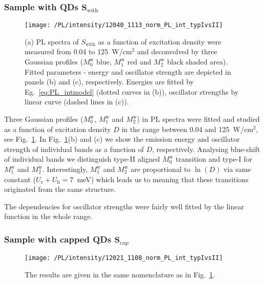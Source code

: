 \subsubsection*{Sample with QDs $\mathbf{S_\mathrm{with}}$}
\begin{figure}
	\centering
	\texttt{[image: /PL/intensity/12040\_1113\_norm\_PL\_int\_typIvsII]}
	\caption{(a) PL spectra of $S_\mathrm{with}$ as a function of excitation density were measured from 0.04 to 125~W/cm$^2$ and deconvolved by three Gaussian profiles ($M_0^\mathrm{w}$ blue, $M_1^\mathrm{w}$ red and $M_2^\mathrm{w}$ black shaded area). Fitted parameters - energy and oscillator strength are depicted in panels (b) and (c), respectively. Energies are fitted by Eg.~\ref{eq:PL_intmodel} (dotted curves in (b)), oscillator strengths by linear curve (dashed lines in (c)).}
	\label{fig:QD_w_int}
\end{figure}

Three Gaussian profiles ($M_0^\mathrm{w}$, $M_1^\mathrm{w}$ and $M_2^\mathrm{w}$) in PL spectra were fitted and studied as a function of excitation density $D$ in the range between 0.04 and 125~W/cm$^2$, see Fig.~\ref{fig:QD_w_int}. In Fig.~\ref{fig:QD_w_int}(b) and (c) we show the emission energy and oscillator strength of individual bands as a function of $D$, respectively. Analysing blue-shift of individual bands we distinguish type-II aligned $M_0^\mathrm{w}$ transition and type-I for $M_1^\mathrm{w}$ and $M_2^\mathrm{w}$. Interestingly, $M_1^\mathrm{w}$ and $M_2^\mathrm{w}$ are proportional to $\ln(D)$ via same constant ($U_\mathrm{e}+U_\mathrm{h}=7$~meV) which leads us to meaning that these transitions originated from the same structure. 

The dependencies for oscillator strengths were fairly well fitted by the linear function in the whole range.




\subsubsection*{Sample with capped QDs $\mathbf{S_\mathrm{cap}}$}
\begin{figure}
	\centering
	\texttt{[image: /PL/intensity/12021\_1108\_norm\_PL\_int\_typIvsII]}
	\caption{The results are given in the same nomenclature as in Fig.~\ref{fig:QD_w_int}.}
	\label{fig:QD_cap_int}
\end{figure}

